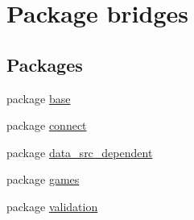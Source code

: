 \hypertarget{namespacebridges}{}\section{Package bridges}
\label{namespacebridges}
\subsection*{Packages}
\begin{DoxyCompactItemize}
\item 
package \hyperlink{namespacebridges_1_1base}{base}
\item 
package \hyperlink{namespacebridges_1_1connect}{connect}
\item 
package \hyperlink{namespacebridges_1_1data__src__dependent}{data\+\_\+src\+\_\+dependent}
\item 
package \hyperlink{namespacebridges_1_1games}{games}
\item 
package \hyperlink{namespacebridges_1_1validation}{validation}
\end{DoxyCompactItemize}
